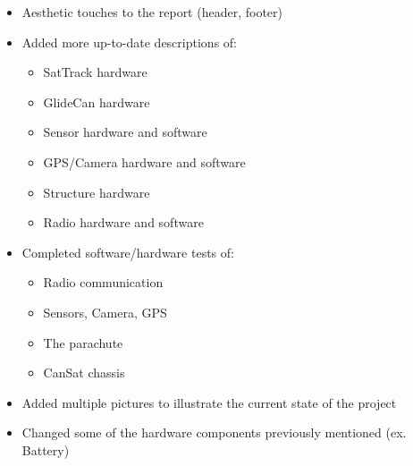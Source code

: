 \documentclass[class=report, crop=false]{standalone}
\begin{document}
\begin{itemize}
\item Aesthetic touches to the report (header, footer)
\item Added more up-to-date descriptions of:
  \begin{itemize}
  \item SatTrack hardware
  \item GlideCan hardware
  \item Sensor hardware and software
  \item GPS/Camera hardware and software
  \item Structure hardware
  \item Radio hardware and software
  \end{itemize}
\item Completed software/hardware tests of:
  \begin{itemize}
  \item Radio communication
  \item Sensors, Camera, GPS
  \item The parachute
  \item CanSat chassis
  \end{itemize}
\item Added multiple pictures to illustrate the current state of the project
\item Changed some of the hardware components previously mentioned (ex. Battery)
\end{itemize}
\end{document}
